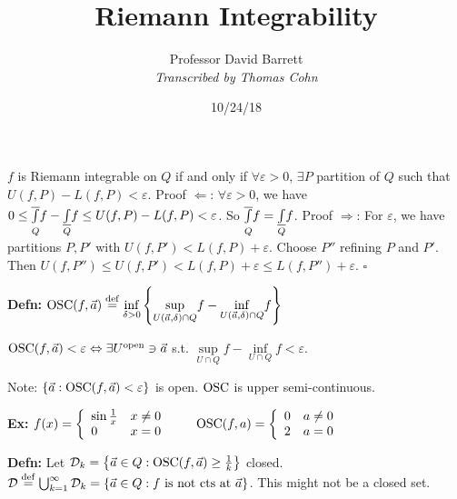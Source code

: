 \documentclass[10pt,letterpaper]{article}
\author{Professor David Barrett\\ \small\textit{Transcribed by Thomas Cohn}}
\title{Riemann Integrability}
\date{10/24/18} %
\newcommand{\n}{\hfill\break}
\newcommand{\defn}[1]{\par\noindent\settowidth{\hangindent}{\textbf{Defn: }}\textbf{Defn: }#1\n}
\newcommand{\ex}[1]{\par\noindent\settowidth{\hangindent}{\textbf{Ex: }}\textbf{Ex: }#1\n}
\newcommand{\proven}{\;$\square$\n}
\newcommand{\ptxt}[1]{\textrm{\textnormal{#1}}}
\newcommand{\set}[1]{\left\{#1\right\}}
\renewcommand{\epsilon}{\varepsilon}
\newcommand{\lint}[2]{\underset{#1}{\overset{#2}{{\color{black}\underline{{\color{white}\overline{{\color{black}\int}}\color{black}}}}}}}
\newcommand{\uint}[2]{\underset{#1}{\overset{#2}{{\color{white}\underline{{\color{black}\overline{{\color{black}\int}}\color{black}}}}}}}
\newcommand{\st}{s.t.}
\begin{document}
\maketitle
\setlength\RaggedRightParindent{\parindent}
\RaggedRight

\par\noindent $f$ is Riemann integrable on $Q$ if and only if $\forall\epsilon>0$, $\exists{}P$ partition of $Q$ such that $U(f,P)-L(f,P)<\epsilon$.\n
Proof $\Leftarrow$: $\forall\epsilon>0$, we have $0\le\uint{Q}{}f-\lint{Q}{}f\le{}U(f,P)-L(f,P)<\epsilon$. So $\uint{Q}{}f=\lint{Q}{}f$.\n
Proof $\Rightarrow$: For $\epsilon$, we have partitions $P,P'$ with $U(f,P')<L(f,P)+\epsilon$. Choose $P''$ refining $P$ and $P'$. Then $U(f,P'')\le{}U(f,P')<L(f,P)+\epsilon\le{}L(f,P'')+\epsilon$.\n
\proven

\newcommand{\OSC}{\ptxt{OSC}}
\defn{$\OSC(f,\vec{a})\overset{\ptxt{def}}{=}\underset{\delta>0}{\inf}\set{\underset{U(\vec{a},\delta)\cap{}Q}{\sup}f-\underset{U(\vec{a},\delta)\cap{}Q}{\inf}f}$}

\par\noindent $\OSC(f,\vec{a})<\epsilon\Leftrightarrow\exists{}U^{\ptxt{open}}\ni\vec{a}$ \st{} $\underset{U\cap{}Q}{\sup}f-\underset{U\cap{}Q}{\inf}f<\epsilon$.\n

\par\noindent Note: $\set{\vec{a}:\OSC(f,\vec{a})<\epsilon}$ is open. $\OSC$ is upper semi-continuous.\n

\ex{$f(x)=\left\{\begin{array}{ll}\sin\frac{1}{x} & x\ne{}0\\ 0 & x=0\end{array}\right.\qquad\OSC(f,a)=\left\{\begin{array}{ll}0 & a\ne{}0\\ 2 & a=0\end{array}\right.$}

\defn{Let $\mathcal{D}_{k}=\set{\vec{a}\in{}Q:\OSC(f,\vec{a})\ge\frac{1}{k}}$ closed. $\mathcal{D}\overset{\ptxt{def}}{=}\bigcup_{k=1}^{\infty}\mathcal{D}_{k}=\set{\vec{a}\in{}Q:f\ptxt{ is not cts at }\vec{a}}$. This might not be a closed set.}
\end{document}
